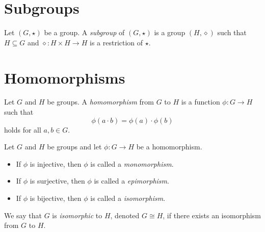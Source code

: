 \section{Subgroups}
\begin{definition}
  Let $(G, \star)$ be a group.
  A \emph{subgroup} of $(G, \star)$ is a group $(H, \diamond)$ such that
  $H \subseteq G$ and $\diamond: H \times H \to H$ is a restriction of $\star$.
\end{definition}

\section{Homomorphisms}
\begin{definition}
  Let $G$ and $H$ be groups.
  A \emph{homomorphism} from $G$ to $H$ is a function $\phi: G \to H$ such that
  \begin{equation*}
    \phi(a \cdot b) = \phi(a) \cdot \phi(b)
  \end{equation*}
  holds for all $a, b \in G$.
\end{definition}

\begin{definition}
  Let $G$ and $H$ be groups and let $\phi: G \to H$ be a homomorphism.
  \begin{itemize}
    \item If $\phi$ is injective, then $\phi$ is called a \emph{monomorphism}.
    \item If $\phi$ is surjective, then $\phi$ is called a \emph{epimorphism}.
    \item If $\phi$ is bijective, then $\phi$ is called a \emph{isomorphism}.
  \end{itemize}
  We say that $G$ is \emph{isomorphic} to $H$, denoted $G \cong H$, if there
  exists an isomorphism from $G$ to $H$.
\end{definition}